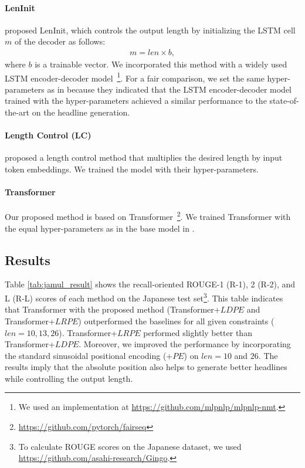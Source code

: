 \documentclass[11pt,a4paper]{article}
\begin{document}
\paragraph{LenInit}
 proposed LenInit, which controls the output length by initializing the LSTM cell $m$ of the decoder as follows:
\begin{align}
  m = len \times b,
\end{align}
where $b$ is a trainable vector.
We incorporated this method with a widely used LSTM encoder-decoder model~\cite{luong-pham-manning:2015:EMNLP}\footnote{We used an implementation at \href{https://github.com/mlpnlp/mlpnlp-nmt}{https://github.com/mlpnlp/mlpnlp-nmt}.}.
For a fair comparison, we set the same hyper-parameters as in  because they indicated that the LSTM encoder-decoder model trained with the hyper-parameters achieved a similar performance to the state-of-the-art on the headline generation.

\paragraph{Length Control (LC)}
 proposed a length control method that multiplies the desired length by input token embeddings.
We trained the model with their hyper-parameters.

\paragraph{Transformer}
Our proposed method is based on Transformer~\cite{NIPS2017_7181}\footnote{\href{https://github.com/pytorch/fairseq}{https://github.com/pytorch/fairseq}}.
We trained Transformer with the equal hyper-parameters as in the base model in .

\subsection{Results}
Table \ref{tab:jamul_result} shows the recall-oriented ROUGE-1 (R-1), 2 (R-2), and L (R-L) scores of each method on the Japanese test set\footnote{To calculate ROUGE scores on the Japanese dataset, we used \href{https://github.com/asahi-research/Gingo}{https://github.com/asahi-research/Gingo}.}.
This table indicates that Transformer with the proposed method (Transformer+$LDPE$ and Transformer+$LRPE$) outperformed the baselines for all given constraints ($len=10, 13, 26$).
Transformer+$LRPE$ performed slightly better than Transformer+$LDPE$.
Moreover, we improved the performance by incorporating the standard sinusoidal positional encoding (+$PE$) on $len=10$ and $26$.
The results imply that the absolute position also helps to generate better headlines while controlling the output length.
\end{document}
